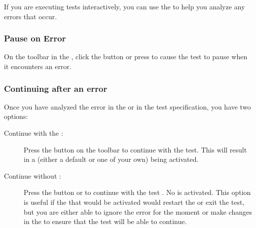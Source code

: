 
If you are executing tests interactively, you can use the \ite{} to help you analyze any errors that occur.

\subsubsection{Pause on Error}
On the toolbar in the \ite{}, click the  button
or press  to cause the test to pause when it encounters an error. 


\subsubsection{Continuing after an error}
Once you have analyzed the error in the \gdaut{} or in the test specification, you have two options:

\begin{description}
\item [Continue with the \gdehandler{}:]{Press the  button on the toolbar  to continue with the test. This will result in a \gdehandler{} (either a default \gdehandler{} or one of your own) being activated.}
\item [Continue without \gdehandler{}:]{Press the  button or  to continue with the test . No \gdehandler{} is activated. This option is useful if the \gdehandler{} that would be activated would restart the \gdaut{} or exit the test, but you are either able to ignore the error for the moment or make changes in the \gdaut{} to ensure that the test will be able to continue. }
\end{description}
